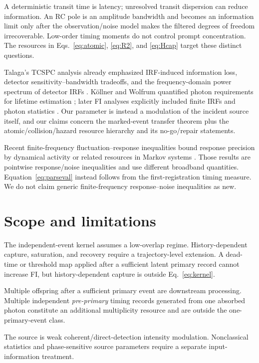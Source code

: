 \documentclass[aps,prapplied,preprint,nofootinbib]{revtex4-2}
\begin{document}
A deterministic transit time is latency; unresolved transit dispersion can reduce information. An RC pole is an amplitude bandwidth and becomes an information limit only after the observation/noise model makes the filtered degrees of freedom irrecoverable. Low-order timing moments do not control prompt concentration. The resources in Eqs.~\eqref{eq:atomic}, \eqref{eq:R2}, and \eqref{eq:Hcap} target these distinct questions.

Talaga's TCSPC analysis already emphasized IRF-induced information loss, detector sensitivity--bandwidth tradeoffs, and the frequency-domain power spectrum of detector IRFs \cite{Talaga2009}. K\"ollner and Wolfrum quantified photon requirements for lifetime estimation \cite{KollnerWolfrum1992}; later FI analyses explicitly included finite IRFs and photon statistics \cite{Bouchet2019,TrinhEsposito2021}. Our parameter is instead a modulation of the incident source itself, and our claims concern the marked-event transfer theorem plus the atomic/collision/hazard resource hierarchy and its no-go/repair statements.

Recent finite-frequency fluctuation--response inequalities bound response precision by dynamical activity or related resources in Markov systems \cite{Dechant2026}. Those results are pointwise response/noise inequalities and use different broadband quantities. Equation~\eqref{eq:parseval} instead follows from the first-registration timing measure. We do not claim generic finite-frequency response--noise inequalities as new.

\section{Scope and limitations}

The independent-event kernel assumes a low-overlap regime. History-dependent capture, saturation, and recovery require a trajectory-level extension. A dead-time or threshold map applied after a sufficient latent primary record cannot increase FI, but history-dependent capture is outside Eq.~\eqref{eq:kernel}.

Multiple offspring after a sufficient primary event are downstream processing. Multiple independent \emph{pre-primary} timing records generated from one absorbed photon constitute an additional multiplicity resource and are outside the one-primary-event class.

The source is weak coherent/direct-detection intensity modulation. Nonclassical statistics and phase-sensitive source parameters require a separate input-information treatment.
\end{document}
